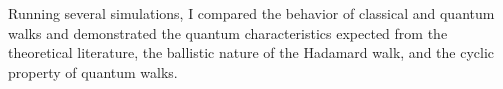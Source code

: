 Running several simulations, I compared the behavior of classical and quantum walks and demonstrated the quantum characteristics expected from the theoretical literature, the ballistic nature of the Hadamard walk, and the cyclic property of quantum walks.


\vfill
\selectthesislanguage

\setcounter{romanPage}{\value{page}}
